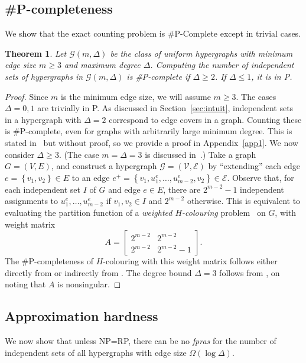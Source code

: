 \documentclass[11pt]{article}
\newtheorem{thm}{Theorem}[section]
\theoremstyle{definition}
\theoremstyle{remark}
\newcommand{\set}[1]{\left\{#1\right\}}
\newcommand{\CE}{\mathcal{E}}
\newcommand{\CG}{\mathcal{G}}
\newcommand{\CV}{\mathcal{V}}
\begin{document}
\subsection{\#P-completeness}\label{sec:hardnump}
We show that the exact counting problem is \#P-Complete except in trivial
cases.
\begin{thm}\label{h-thm10}
Let $\CG(m,\Delta)$ be the class of uniform hypergraphs with minimum edge
size $m\geq 3$ and maximum degree $\Delta$. Computing the number of independent
sets of hypergraphs in $\CG(m,\Delta)$ is \#P-complete if $\Delta \geq 2$.
If $\Delta \leq 1$, it is in P.
\end{thm}
\begin{proof}
Since $m$ is the minimum edge size, we will assume $m\geq 3$. The cases
$\Delta=0,1$ are trivially in P. As discussed in Section~\ref{sec:intuit},
independent sets in a hypergraph with $\Delta=2$ correspond to edge covers
in a graph. Counting these is \#P-complete, even for graphs with
arbitrarily large minimum degree. This is stated in~\cite{BD97} but without
proof, so we provide a proof in Appendix~\ref{app1}. We now consider
$\Delta \geq 3$. (The case $m=\Delta=3$ is discussed in~\cite{DG00a}.) Take
a graph $G=(V,E)$, and construct a hypergraph $\CG=(\CV,\CE)$ by
``extending'' each edge $e=\set{v_1,v_2}\in E$ to an edge
$e^+=\set{v_1,u^e_1,\ldots, u^e_{m-2},v_2}\in \CE$. Observe that, for each
independent set $I$ of $G$ and edge $e\in E$, there are $2^{m-2}-1$
independent assignments to $u^e_1,\ldots, u^e_{m-2}$ if $v_1,v_2\in I$ and
$2^{m-2}$ otherwise. This is equivalent to evaluating the partition
function of a \emph{weighted $H$-colouring} problem~\cite{BG04,DG00b} on
$G$, with weight matrix
\[ A=\begin{bmatrix} 2^{m-2} & 2^{m-2}\\ 2^{m-2} & 2^{m-2}-1 \end{bmatrix}.\]
The \#P-completeness of $H$-colouring with this weight matrix follows
either directly from \cite{BG04} or indirectly from \cite[Corollary
3.2]{DG00b}. The degree bound $\Delta=3$ follows from \cite[Theorem
5.1]{DG00b}, on noting that $A$ is nonsingular.
\end{proof}
\subsection{Approximation hardness}
We now show that unless NP\/=\/RP, there can be no \emph{fpras}
for the number of independent sets of all hypergraphs with edge size
$\Omega(\log\Delta)$.
\end{document}
